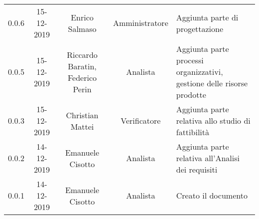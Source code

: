 {\begin{longtable}{ c c  c  c C{4cm}}
0.0.6 & 15-12-2019 & Enrico Salmaso & Amministratore & Aggiunta parte di progettazione \\

0.0.5 & 15-12-2019 & Riccardo Baratin, Federico Perin & Analista & Aggiunta parte processi organizzativi, gestione delle risorse prodotte \\

0.0.3 & 15-12-2019 & Christian Mattei & Verificatore & Aggiunta parte relativa allo studio di fattibilità \\

0.0.2 & 14-12-2019 & Emanuele Cisotto & Analista & Aggiunta parte relativa all’Analisi dei requisiti \\

0.0.1 & 14-12-2019 & Emanuele Cisotto & Analista & Creato il documento \\
		
\end{longtable}
}